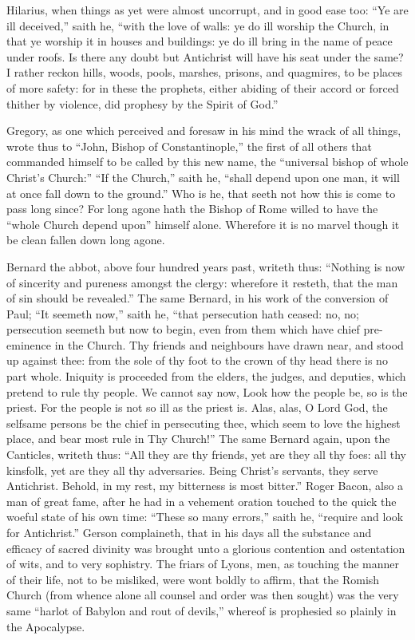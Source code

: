Hilarius, when things as yet were almost uncorrupt, and in good ease
too: “Ye are ill deceived,” saith he, “with the love
of walls: ye do ill worship the Church, in that ye worship it in houses
and buildings: ye do ill bring in the name of peace under roofs.
Is there any doubt but Antichrist will have his seat under the same?
I rather reckon hills, woods, pools, marshes, prisons, and quagmires,
to be places of more safety: for in these the prophets, either abiding
of their accord or forced thither by violence, did prophesy by the Spirit
of God.”

Gregory, as one which perceived and foresaw in his mind the wrack
of all things, wrote thus to “John, Bishop of Constantinople,”
the first of all
others that commanded himself to be called by this new name, the “universal
bishop of whole Christ’s Church:” “If the Church,”
saith he, “shall depend upon one man, it will at once fall down
to the ground.” Who is he, that seeth not how this is come
to pass long since? For long agone hath the Bishop of Rome willed
to have the “whole Church depend upon” himself alone.
Wherefore it is no marvel though it be clean fallen down long agone.

Bernard the abbot, above four hundred years past, writeth thus: “Nothing
is now of sincerity and pureness amongst the clergy: wherefore it resteth,
that the man of sin should be revealed.” The same Bernard,
in his work of the conversion of Paul; “It seemeth now,”
saith he, “that persecution hath ceased: no, no; persecution seemeth
but now to begin, even from them which have chief pre-eminence in the
Church. Thy friends and neighbours have drawn near, and stood
up against thee: from the sole of thy foot to the crown of thy head
there is no part whole. Iniquity is proceeded from the elders,
the judges, and deputies, which pretend to rule thy people. We
cannot say now, Look how the people be, so is the priest. For
the people is not so ill as the priest is. Alas, alas, O Lord
God, the selfsame persons be the chief
in persecuting thee, which seem to love the highest place, and bear
most rule in Thy Church!” The same Bernard again, upon the
Canticles, writeth thus: “All they are thy friends, yet are they
all thy foes: all thy kinsfolk, yet are they all thy adversaries.
Being Christ’s servants, they serve Antichrist. Behold,
in my rest, my bitterness is most bitter.” Roger Bacon,
also a man of great fame, after he had in a vehement oration touched
to the quick the woeful state of his own time: “These so many
errors,” saith he, “require and look for Antichrist.”
Gerson complaineth, that in his days all the substance and efficacy
of sacred divinity was brought unto a glorious contention and ostentation
of wits, and to very sophistry. The friars of Lyons, men, as touching
the manner of their life, not to be misliked, were wont boldly to affirm,
that the Romish Church (from whence alone all counsel and order was
then sought) was the very same “harlot of Babylon and rout of
devils,” whereof is prophesied so plainly in the Apocalypse.

